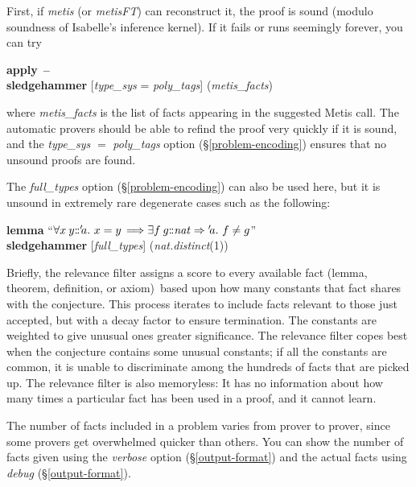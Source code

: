 \documentclass[a4paper,12pt]{article}
\def\Colon{\mathord{:\mkern-1.5mu:}}
\begin{document}

First, if \emph{metis} (or \emph{metisFT}) can reconstruct it, the proof is
sound (modulo soundness of Isabelle's inference kernel). If it fails or runs
seemingly forever, you can try

\prew
\textbf{apply}~\textbf{--} \\
\textbf{sledgehammer} [\textit{type\_sys} = \textit{poly\_tags}] (\textit{metis\_facts})
\postw

where \textit{metis\_facts} is the list of facts appearing in the suggested
Metis call. The automatic provers should be able to refind the proof very
quickly if it is sound, and the \textit{type\_sys} $=$ \textit{poly\_tags}
option (\S\ref{problem-encoding}) ensures that no unsound proofs are found.

The \textit{full\_types} option (\S\ref{problem-encoding}) can also be used
here, but it is unsound in extremely rare degenerate cases such as the
following:

\prew
\textbf{lemma} ``$\forall x\> y\Colon{'}\!a.\ x = y \,\Longrightarrow \exists f\> g\Colon\mathit{nat} \Rightarrow {'}\!a.\ f \not= g$'' \\
\textbf{sledgehammer} [\textit{full\_types}] (\textit{nat.distinct\/}(1))
\postw


Briefly, the relevance filter assigns a score to every available fact (lemma,
theorem, definition, or axiom)\ based upon how many constants that fact shares
with the conjecture. This process iterates to include facts relevant to those
just accepted, but with a decay factor to ensure termination. The constants are
weighted to give unusual ones greater significance. The relevance filter copes
best when the conjecture contains some unusual constants; if all the constants
are common, it is unable to discriminate among the hundreds of facts that are
picked up. The relevance filter is also memoryless: It has no information about
how many times a particular fact has been used in a proof, and it cannot learn.

The number of facts included in a problem varies from prover to prover, since
some provers get overwhelmed quicker than others. You can show the number of
facts given using the \textit{verbose} option (\S\ref{output-format}) and the
actual facts using \textit{debug} (\S\ref{output-format}).
\end{document}

